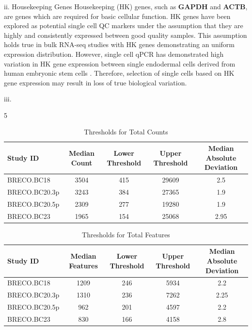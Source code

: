 ii. Housekeeping Genes
Housekeeping (HK) genes, such as \textbf{GAPDH} and \textbf{ACTB}, are genes which are required for basic cellular function. HK genes have been explored as potential single cell QC markers under the assumption that they are highly and consistently expressed between good quality samples. This assumption holds true in bulk RNA-seq studies with HK genes demonstrating an uniform expression distribution. However, single cell qPCR has demonstrated high variation in HK gene expression between single endodermal cells derived from human embryonic stem cells \cite{Oyolu2012}. Therefore, selection of single cells based on HK gene expression may result in loss of true biological variation.

iii. 

\begin{table}[ht]
	\centering
	\small
	\renewcommand{\arraystretch}{1.4}
	{\columnwidth}{5}
	\begin{tabular}{|l| c | c | c | c |}
		\hline
		Study ID	&	Median Count & Lower Threshold & Upper Threshold & Median Absolute Deviation \\
		\hline
		BRECO.BC18 		& 3504 & 415 & 29609 & 2.5 	\\
		
		BRECO.BC20.3p 	& 3243 & 384 & 27365 & 1.9 		\\
		
		BRECO.BC20.5p 	& 2309 & 277 & 19280 & 1.9 		\\
		
		BRECO.BC23 		& 1965 & 154 & 25068 & 2.95\\
		\hline
	\end{tabular}
	\caption{Thresholds for Total Counts}
	\label{tab: qc_thesholds_counts}
\end{table}


\begin{table}[ht]
	\centering
	\small
	\renewcommand{\arraystretch}{1.4}
	\begin{tabular}{| l | c | c | c | c |}
		\hline
		Study ID	&	Median Features & Lower Threshold & Upper Threshold & Median Absolute Deviation \\
		\hline
		BRECO.BC18 		& 1209 & 246 & 5934 & 2.2 	\\
		BRECO.BC20.3p 	& 1310 & 236 & 7262 & 2.25	\\
		BRECO.BC20.5p 	& 962  & 201 & 4597 & 2.2 	\\
		BRECO.BC23 		& 830  & 166 & 4158 & 2.8	\\
		\hline
	\end{tabular}
	\caption{Thresholds for Total Features}
	\label{tab: qc_thesholds_features}
\end{table}

